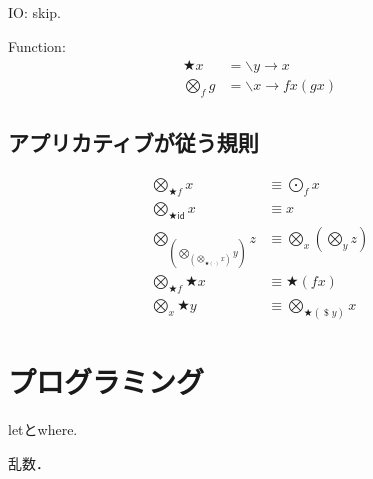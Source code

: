 \documentclass[twocolumn]{jsbook}
\newcommand{\applicativefunc}{\bigotimes}
\newcommand{\dollar}{\mathop{\$}}
\newcommand{\mapfunc}{\bigodot}
\newcommand{\pure}{\bigstar}
\newcommand{\specialkeyword}[1]{\textsf{#1}}
\newcommand{\identity}{\specialkeyword{id}}
\begin{document}
IO: skip.

Function:
\begin{align*}
\pure x&=\backslash y\rightarrow x\\
\applicativefunc_fg&=\backslash x\rightarrow fx(gx)
\end{align*}

\section{アプリカティブが従う規則}

\begin{align}
\applicativefunc_{\pure f}x&\equiv\mapfunc_fx\\
\applicativefunc_{\pure\identity}x&\equiv x\\
\applicativefunc_{\left(\applicativefunc_{\left(\applicativefunc_{\pure(\cdot)}x\right)}y\right)}z&\equiv\applicativefunc_x\left(\applicativefunc_yz\right)\\
\applicativefunc_{\pure f}\pure x&\equiv\pure(fx)\\
\applicativefunc_x\pure y&\equiv\applicativefunc_{\pure(\dollar y)}x
\end{align}


\chapter{プログラミング}

letとwhere.

乱数．
\end{document}
